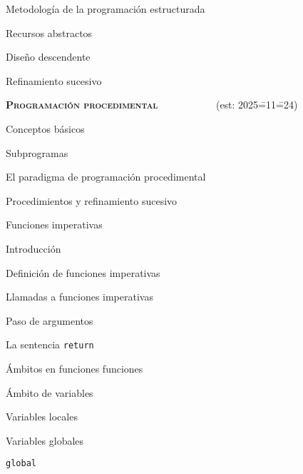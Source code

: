 \begin{longenum}
\begin{longenum}
\begin{longenum}
\begin{longenum}
            \end{longenum}
        \end{longenum}
        \item Metodología de la programación estructurada
        \begin{longenum}
            \item Recursos abstractos
            \item Diseño descendente
            \item Refinamiento sucesivo
        \end{longenum}
    \end{longenum}
    \item \textbf{\textsc{Programación procedimental}} \ \ \ \ \ \ \ \ \ \ \ (est: 2025\==11\==24)
    \begin{longenum}
        \item Conceptos básicos
        \begin{longenum}
            \item Subprogramas
            \item El paradigma de programación procedimental
            \item Procedimientos y refinamiento sucesivo
        \end{longenum}
        \item Funciones imperativas
        \begin{longenum}
            \item Introducción
            \item Definición de funciones imperativas
            \item Llamadas a funciones imperativas
            \item Paso de argumentos
            \item La sentencia \texttt{return}
        \end{longenum}
        \item Ámbitos en funciones funciones
        \begin{longenum}
            \item Ámbito de variables
            \begin{longenum}
                \item Variables locales
                \item Variables globales
                \begin{longenum}
                    \item \texttt{global}

\end{longenum}
\end{longenum}
\end{longenum}
\end{longenum}
\end{longenum}
